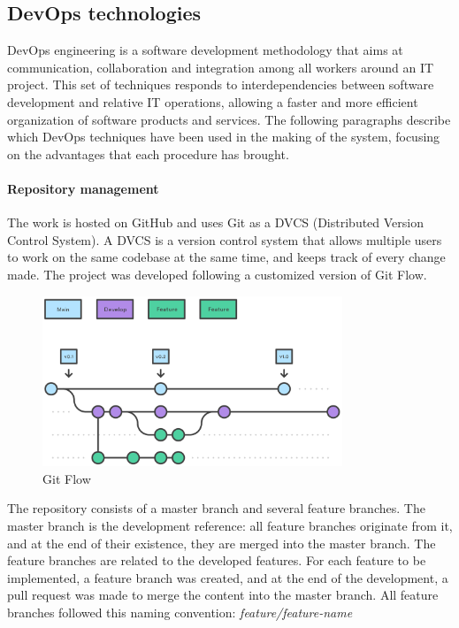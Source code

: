 \documentclass[12pt,a4paper,openright,twoside]{book}
\begin{document}
\subsection*{DevOps technologies}
DevOps engineering is a software development methodology that aims at communication, collaboration and integration among all workers around an IT project. 
This set of techniques responds to interdependencies between software development and relative IT operations, allowing a faster and more efficient organization of software products and services.
The following paragraphs describe which DevOps techniques have been used in the making of the system, focusing on the advantages that each procedure has brought.

\paragraph*{Repository management}
The work is hosted on GitHub and uses Git as a DVCS (Distributed Version Control System).
A DVCS is a version control system that allows multiple users to work on the same codebase at the same time, and keeps track of every change made.
The project was developed following a customized version of Git Flow. 

\begin{figure}[h]
  \centering
  \includegraphics[width=0.8\textwidth]{figures/gitflow.png}
  \caption{Git Flow}
  \label{fig:git-flow}
\end{figure}

The repository consists of a master branch and several feature branches.
The master branch is the development reference: all feature branches originate from it, and at the end of their existence, they are merged into the master branch.
The feature branches are related to the developed features. 
For each feature to be implemented, a feature branch was created, and at the end of the development, a pull request was made to merge the content into the master branch.
All feature branches followed this naming convention: \textit{feature/{feature-name}}
\end{document}
